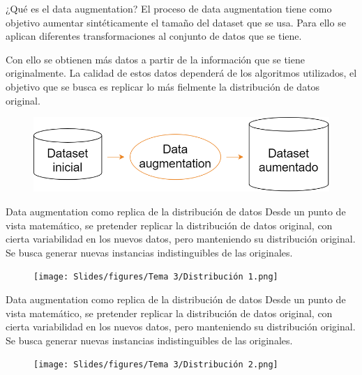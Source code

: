\begin{frame}{¿Qué es el data augmentation?}
El proceso de \alert{data augmentation} tiene como objetivo \alert{aumentar sintéticamente} el tamaño del dataset que se usa. Para ello se aplican diferentes \alert{transformaciones} al conjunto de datos que se tiene.

Con ello se obtienen \alert{más datos} a partir de la información que se tiene originalmente. La \alert{calidad} de estos datos dependerá de los algoritmos utilizados, el objetivo que se busca es \alert{replicar} lo más fielmente la distribución de datos original.

\begin{figure}
    \centering
    \includegraphics[width=\textwidth]{Slides/figures/Tema 3/DA_Scheme.png}
\end{figure}
\end{frame}

\begin{frame}{Data augmentation como replica de la distribución de datos}
Desde un punto de vista matemático, se pretender \alert{replicar la distribución} de datos original, con cierta \alert{variabilidad} en los nuevos datos, pero manteniendo su \alert{distribución original}. Se busca generar nuevas instancias \alert{indistinguibles} de las originales.

\begin{figure}
    \centering
    \texttt{[image: Slides/figures/Tema 3/Distribución 1.png]}
\end{figure}
\end{frame}

\begin{frame}{Data augmentation como replica de la distribución de datos}
Desde un punto de vista matemático, se pretender \alert{replicar la distribución} de datos original, con cierta \alert{variabilidad} en los nuevos datos, pero manteniendo su \alert{distribución original}. Se busca generar nuevas instancias \alert{indistinguibles} de las originales.

\begin{figure}
    \centering
    \texttt{[image: Slides/figures/Tema 3/Distribución 2.png]}
\end{figure}
\end{frame}


